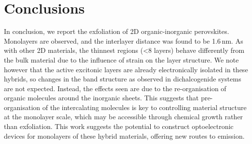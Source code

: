 \section{Conclusions}
In conclusion, we report the exfoliation of 2D organic-inorganic perovskites. Monolayers are observed, and the interlayer distance was found to be 1.6\,nm. As with other 2D materials, the thinnest regions (\textless8 layers) behave differently from the bulk material due to the influence of strain on the layer structure. We note however that the active excitonic layers are already electronically isolated in these hybrids, so changes in the band structure as observed in dichalcogenide systems are not expected. Instead, the effects seen are due to the re-organisation of organic molecules around the inorganic sheets. This suggests that pre-organisation of the intercalating molecules is key to controlling material structure at the monolayer scale, which may be accessible through chemical growth rather than exfoliation. This work suggests the potential to construct optoelectronic devices for monolayers of these hybrid materials, offering new routes to emission. 

